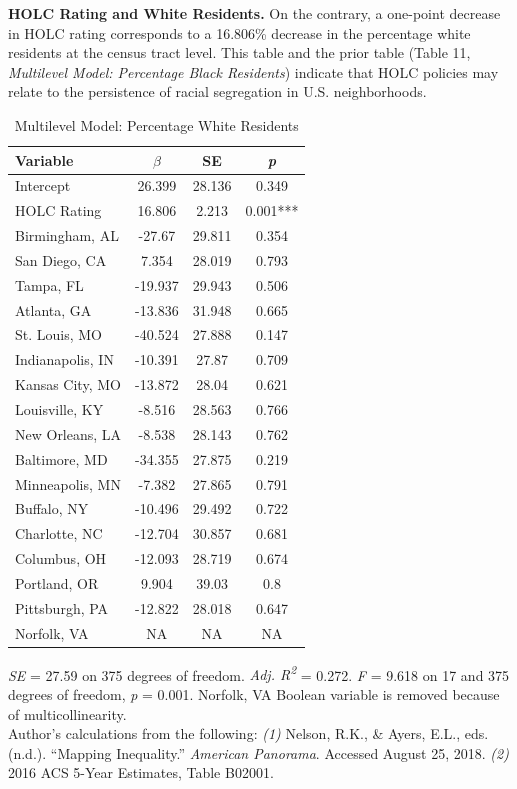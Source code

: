 \documentclass[paper=letter, fontsize=12pt]{scrartcl} %
\begin{document}
\begin{table}
	\textbf{HOLC Rating and White Residents.} On the contrary, a one-point decrease in HOLC rating corresponds to a 16.806\% decrease in the percentage white residents at the census tract level. This table and the prior table (Table 11, \textit{Multilevel Model: Percentage Black Residents}) indicate that HOLC policies may relate to the persistence of racial segregation in U.S. neighborhoods.
	\caption{Multilevel Model: Percentage White Residents}
	\begin{center}
		\begin{tabular}{|| l | c c c ||}
			\hline
			Variable & $\beta$ & SE & \textit{p}\\
			\hline \hline
			Intercept & 26.399 & 28.136 & 0.349\\ 
			\hline 
			HOLC Rating & 16.806 & 2.213 & 0.001***\\ 
			\hline 
			Birmingham, AL & -27.67 & 29.811 & 0.354\\ 
			\hline 
			San Diego, CA & 7.354 & 28.019 & 0.793\\ 
			\hline 
			Tampa, FL & -19.937 & 29.943 & 0.506\\ 
			\hline 
			Atlanta, GA & -13.836 & 31.948 & 0.665\\ 
			\hline 
			St. Louis, MO & -40.524 & 27.888 & 0.147\\ 
			\hline 
			Indianapolis, IN & -10.391 & 27.87 & 0.709\\ 
			\hline 
			Kansas City, MO & -13.872 & 28.04 & 0.621\\ 
			\hline 
			Louisville, KY & -8.516 & 28.563 & 0.766\\ 
			\hline 
			New Orleans, LA & -8.538 & 28.143 & 0.762\\ 
			\hline 
			Baltimore, MD & -34.355 & 27.875 & 0.219\\ 
			\hline 
			Minneapolis, MN & -7.382 & 27.865 & 0.791\\ 
			\hline 
			Buffalo, NY & -10.496 & 29.492 & 0.722\\ 
			\hline 
			Charlotte, NC & -12.704 & 30.857 & 0.681\\ 
			\hline 
			Columbus, OH & -12.093 & 28.719 & 0.674\\ 
			\hline 
			Portland, OR & 9.904 & 39.03 & 0.8\\ 
			\hline 
			Pittsburgh, PA & -12.822 & 28.018 & 0.647\\ 
			\hline 
			Norfolk, VA & NA & NA & NA\\  
			\hline
		\end{tabular}
	\end{center}
\textit{SE} = 27.59 on 375 degrees of freedom. \textit{Adj. R\textsuperscript{2}} = 0.272. \textit{F} = 9.618 on 17 and 375 degrees of freedom, \textit{p} = 0.001. Norfolk, VA Boolean variable is removed because of multicollinearity.\\
Author's calculations from the following: \textit{(1)} Nelson, R.K., \& Ayers, E.L., eds. (n.d.). ``Mapping Inequality.'' \textit{American Panorama}. Accessed August 25, 2018. \textit{(2)} 2016 ACS 5-Year Estimates, Table B02001.
\end{table}
\end{document}
